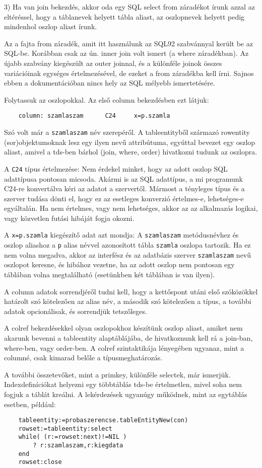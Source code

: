 3) Ha van join bekezdés, akkor oda egy SQL select from záradékot
írunk azzal az eltéréssel, hogy a táblanevek helyett tábla aliast, 
az oszlopnevek helyett pedig mindenhol oszlop aliast írunk.

Az a fajta from záradék, amit itt használunk az SQL92 szabvánnyal
került be az SQL-be. Korábban csak az ún. inner join volt ismert
(a where záradékban). Az újabb szabvány kiegészült az outer joinnal,
és a különféle joinok összes variációinak egységes értelmezésével,
de ezeket a from záradékba kell írni. Sajnos ebben a dokumentációban
nincs hely az SQL mélyebb ismertetésére.

Folytassuk az oszlopokkal. Az első column bekezdésben ezt látjuk:
\begin{verbatim}
    column: szamlaszam      C24     x=p.szamla
\end{verbatim}

Szó volt már a \verb!szamlaszam! név szerepéről.  
A tableentityből származó rowentity (sor)objektumoknak lesz
egy ilyen nevű attribútuma, egyúttal bevezet egy oszlop aliast,
amivel a tds-ben bárhol (join, where, order) hivatkozni tudunk
az oszlopra. 

A \verb!C24! típus értelmezése: Nem érdekel minket, hogy az
adott oszlop SQL adattípusa pontosan micsoda. Akármi is az
SQL adattípus, a mi programunk C24-re konvertálva kéri az adatot
a szervertől. Mármost a tényleges típus és a szerver tudása
dönti el, hogy ez az esetleges konverzió értelmes-e, lehetséges-e
egyáltalán. Ha nem értelmes, vagy nem lehetséges, akkor az az
alkalmazás logikai, vagy közvetlen futási hibáját fogja okozni.

A \verb!x=p.szamla! kiegészítő adat azt mondja: A \verb!szamlaszam!
metódusnévhez és oszlop aliashoz a \verb!p!  alias névvel
azonosított tábla \verb!szamla! oszlopa tartozik. Ha ez nem volna megadva, 
akkor az interfész és az adatbázis szerver \verb!szamlaszam! nevű oszlopot 
keresne, és hibához vezetne, ha az adott oszlop nem pontosan egy 
táblában volna megtalálható (esetünkben két táblában is van ilyen). 

A column adatok sorrendjéről tudni kell, hogy a kettőspont
utáni első szóközökkel határolt szó kötelezően az alias név,
a második szó kötelezően a típus, a további adatok opcionálisak,
és sorrendjük tetszőleges.

A colref bekezdésekkel olyan oszlopokhoz készítünk oszlop
aliast, amiket nem akarunk bevenni a tableentity alaptáblájába,
de hivatkoznunk kell rá a join-ban, where-ben, vagy order-ben.
A colref szintaktikája lényegében ugyanaz, mint a columné,
csak kimarad belőle a típusmeghatározás.

A további összetevőket, mint a  primkey, különféle selectek,
már ismerjük. Indexdefiníciókat helyezni egy többtáblás tds-be
értelmetlen, mivel soha nem fogjuk a táblát kreálni.
A lekérdezések ugyanúgy működnek, mint az egytáblás esetben,
például:
\begin{verbatim}
    tableentity:=probaszerencse.tableEntityNew(con)
    rowset:=tableentity:select
    while( (r:=rowset:next)!=NIL )
        ? r:szamlaszam,r:kiegdata
    end
    rowset:close
\end{verbatim}

